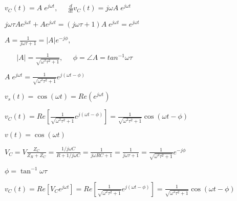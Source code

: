 \documentclass{article}
\def\lthtmlcheckvsize{\ifdim\ht\sizebox<\vsize 
  \ifdim\wd\sizebox<\hsize\expandafter\hfill\fi \expandafter\vfill
  \else\expandafter\vss\fi}%
\begin{document}
{\newpage\clearpage
{}%
$\displaystyle v_C(t)=A\;e^{j\omega t},\;\;\;\;\;\frac{d}{dt}v_C(t)=j\omega A\;e^{j\omega t}$%
\lthtmlindisplaymathZ
\lthtmlcheckvsize\clearpage}

{\newpage\clearpage
{}%
$\displaystyle j\omega \tau A e^{j\omega t}+A e^{j\omega t}
=(j\omega \tau+1)A\; e^{j\omega t}=e^{j\omega t}$%
\lthtmlindisplaymathZ
\lthtmlcheckvsize\clearpage}

{\newpage\clearpage
{}%
$\displaystyle A=\frac{1}{j\omega\tau+1}=|A|e^{-j\phi},\;\;\;\;$%
\lthtmlindisplaymathZ
\lthtmlcheckvsize\clearpage}

{\newpage\clearpage
{}%
$\displaystyle \;\;\;\;\;\;|A|=\frac{1}{\sqrt{\omega^2 \tau^2+1}},\;\;\;\;\;
\phi=\angle A=tan^{-1}\omega\tau$%
\lthtmlindisplaymathZ
\lthtmlcheckvsize\clearpage}

{\newpage\clearpage
{}%
$\displaystyle A\;e^{j\omega t}=\frac{1}{\sqrt{\omega^2 \tau^2+1}} e^{j(\omega t-\phi)}$%
\lthtmlindisplaymathZ
\lthtmlcheckvsize\clearpage}

{\newpage\clearpage
{}%
$ v_s(t)=\cos(\omega t)=Re(e^{j\omega t})$%
\lthtmlindisplaymathZ
\lthtmlcheckvsize\clearpage}

{\newpage\clearpage
{}%
$\displaystyle v_C(t)=Re\left[\frac{1}{\sqrt{\omega^2 \tau^2+1}} e^{j(\omega t-\phi)}\right]
=\frac{1}{\sqrt{\omega^2 \tau^2+1}} \cos(\omega t-\phi)$%
\lthtmlindisplaymathZ
\lthtmlcheckvsize\clearpage}

{\newpage\clearpage
{}%
$ v(t)=\cos(\omega t)$%
\lthtmlindisplaymathZ
\lthtmlcheckvsize\clearpage}

{\newpage\clearpage
{}%
$\displaystyle V_C=V\frac{Z_C}{Z_R+Z_C}=\frac{1/j\omega C}{R+1/j\omega C}
=\frac{1}{j\omega RC+1}=\frac{1}{j\omega \tau+1}
=\frac{1}{\sqrt{\omega^2\tau^2+1}} e^{-j\phi}$%
\lthtmlindisplaymathZ
\lthtmlcheckvsize\clearpage}

{\newpage\clearpage
{}%
$ \phi=\tan^{-1}\omega\tau$%
\lthtmlindisplaymathZ
\lthtmlcheckvsize\clearpage}

{\newpage\clearpage
{}%
$\displaystyle v_C(t)=Re[V_Ce^{j\omega t}]
=Re\left[\frac{1}{\sqrt{\omega^2\tau^2+1}}e^{j(\omega t-\phi)}\right]
=\frac{1}{\sqrt{\omega^2\tau^2+1}}\cos(\omega t-\phi)$%
\lthtmlindisplaymathZ
\lthtmlcheckvsize\clearpage}
\end{document}
